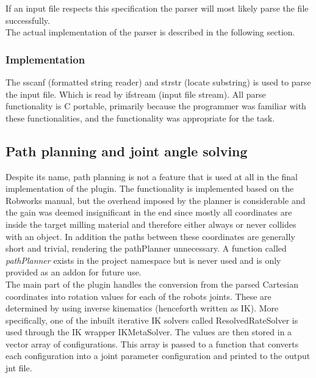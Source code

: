 If an input file respects this specification the parser will most likely parse the file successfully.\\

The actual implementation of the parser is described in the following section.

\subsubsection{Implementation}
\label{sec:parserImpl}
The sscanf (formatted string reader) and strstr (locate substring) is used to parse the input file. Which is read by ifstream (input file stream). All parse functionality is C portable, primarily because the programmer was familiar with these functionalities, and the functionality was appropriate for the task.  

\subsection{Path planning and joint angle solving}
\label{sec:pathplanning}
Despite its name, path planning is not a feature that is used at all in the final implementation of the plugin. The functionality is implemented based on the Robworks manual, but the overhead imposed by the planner is considerable and the gain was deemed insignificant in the end since mostly all coordinates are inside the target milling material and therefore either always or never collides with an object. In addition the paths between these coordinates are generally short and trivial, rendering the pathPlanner unnecessary. A function called \textit{pathPlanner} exists in the project namespace but is never used and is only provided as an addon for future use.\\

The main part of the plugin handles the conversion from the parsed Cartesian coordinates into rotation values for each of the robots joints. These are determined by using inverse kinematics (henceforth written as IK). More specifically, one of the inbuilt iterative IK solvers called ResolvedRateSolver is used through the IK wrapper IKMetaSolver. The values are then stored in a vector array of configurations. This array is passed to a function that converts each configuration into a joint parameter configuration and printed to the output jnt file.

